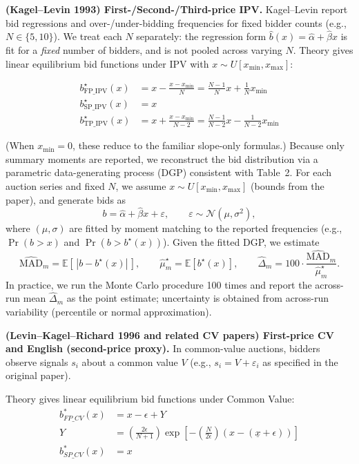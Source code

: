 \documentclass{article} %
\begin{document}
\textbf{(Kagel--Levin 1993) First-/Second-/Third-price IPV.}
Kagel--Levin report bid regressions and over-/under-bidding frequencies for fixed bidder counts (e.g., $N\in\{5,10\}$). We treat each $N$ separately: the regression form $\hat b(x)=\hat\alpha+\hat\beta x$ is fit for a \emph{fixed} number of bidders, and is not pooled across varying $N$.
Theory gives linear equilibrium bid functions under IPV with $x\sim U[x_{\min},x_{\max}]$:

$$\begin{aligned}
b^\star_{\mathrm{FP\_IPV}}(x) &= x - \frac{x-x_{\min}}{N} = \frac{N-1}{N}x + \frac{1}{N}x_{\min} \\
b^\star_{\mathrm{SP\_IPV}}(x) &= x \\
b^\star_{\mathrm{TP\_IPV}}(x) &= x + \frac{x-x_{\min}}{N-2} = \frac{N-1}{N-2}x - \frac{1}{N-2}x_{\min}
\end{aligned}$$

(When $x_{\min}=0$, these reduce to the familiar slope-only formulas.)
Because only summary moments are reported, we reconstruct the bid distribution via a parametric data-generating process (DGP) consistent with Table~2.
For each auction series and fixed $N$, we assume $x\sim U[x_{\min},x_{\max}]$ (bounds from the paper), and generate bids as
\[
b = \hat\alpha+\hat\beta x + \varepsilon,\qquad \varepsilon\sim \mathcal N(\mu,\sigma^2),
\]
where $(\mu,\sigma)$ are fitted by moment matching to the reported frequencies (e.g., $\Pr(b>x)$ and $\Pr(b>b^\star(x))$).
Given the fitted DGP, we estimate
\[
\widehat{\mathrm{MAD}}_m = \mathbb E\!\left[\,|b-b^\star(x)|\,\right],
\qquad
\widehat{\mu}_m^\star=\mathbb E[b^\star(x)],
\qquad
\widehat{\Delta}_m = 100\cdot \frac{\widehat{\mathrm{MAD}}_m}{\widehat{\mu}_m^\star}.
\]
In practice, we run the Monte Carlo procedure 100 times and report the across-run mean $\widehat{\Delta}_m$ as the point estimate; uncertainty is obtained from across-run variability (percentile or normal approximation).


\textbf{(Levin--Kagel--Richard 1996 and related CV papers) First-price CV and English (second-price proxy).}
In common-value auctions, bidders observe signals $s_i$ about a common value $V$ (e.g., $s_i=V+\varepsilon_i$ as specified in the original paper).

Theory gives linear equilibrium bid functions under Common Value:
$$\begin{aligned}
b^*_{FP\_CV}(x) &= x - \epsilon + Y\\
Y &= \left( \frac{2\epsilon}{N+1} \right) \exp\left[ -\left( \frac{N}{2\epsilon} \right) (x - (\underline{x} + \epsilon)) \right]\\
b^*_{SP\_CV}(x) &= x
\end{aligned}$$
\end{document}
